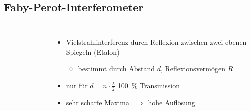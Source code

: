 \documentclass[10pt, aspectratio=169]{beamer}
\begin{document}
\subsection{Faby-Perot-Interferometer}
\label{sec:fpi}
\begin{frame}
  \begin{columns}
    \begin{figure}
    \end{figure}
    \begin{itemize}
    \item<1-> Vielstrahlinterferenz durch Reflexion zwischen zwei
      ebenen Spiegeln (Etalon)
      \begin{itemize}
      \item bestimmt durch Abstand \(d\), Reflexionsverm\"ogen \(R\)
      \end{itemize}
    \item<2-> nur f\"ur \(d=n\cdot\frac{\lambda}{2}\)
      \SI{100}{\percent} Transmission
    \item<3-> sehr scharfe Maxima \(\implies\) hohe Aufl\"osung
    \end{itemize}
  \end{columns}
\end{frame}
\end{document}
